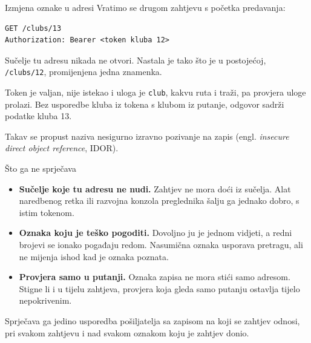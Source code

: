 \begin{frame}[fragile]{Izmjena oznake u adresi}
Vratimo se drugom zahtjevu s početka predavanja:

\begin{lstlisting}
GET /clubs/13
Authorization: Bearer <token kluba 12>
\end{lstlisting}

\vspace{0.4em}
Sučelje tu adresu nikada ne otvori. Nastala je tako što je u postojećoj, \texttt{/clubs/12}, promijenjena jedna znamenka.

\vspace{1.1em}
Token je valjan, nije istekao i uloga je \texttt{club}, kakvu ruta i traži, pa provjera uloge prolazi. Bez usporedbe kluba iz tokena s klubom iz putanje, odgovor sadrži podatke kluba 13.

\vspace{1.1em}
Takav se propust naziva nesigurno izravno pozivanje na zapis (engl. \emph{insecure direct object reference}, IDOR).
\end{frame}

\begin{frame}{Što ga ne sprječava}
\begin{itemize}
  \item \textbf{Sučelje koje tu adresu ne nudi.} Zahtjev ne mora doći iz sučelja. Alat naredbenog retka ili razvojna konzola preglednika šalju ga jednako dobro, s istim tokenom.
  \item \textbf{Oznaka koju je teško pogoditi.} Dovoljno ju je jednom vidjeti, a redni brojevi se ionako pogađaju redom. Nasumična oznaka usporava pretragu, ali ne mijenja ishod kad je oznaka poznata.
  \item \textbf{Provjera samo u putanji.} Oznaka zapisa ne mora stići samo adresom. Stigne li i u tijelu zahtjeva, provjera koja gleda samo putanju ostavlja tijelo nepokrivenim.
\end{itemize}

\vspace{0.5em}
Sprječava ga jedino usporedba pošiljatelja sa zapisom na koji se zahtjev odnosi, pri svakom zahtjevu i nad svakom oznakom koju je zahtjev donio.
\end{frame}

